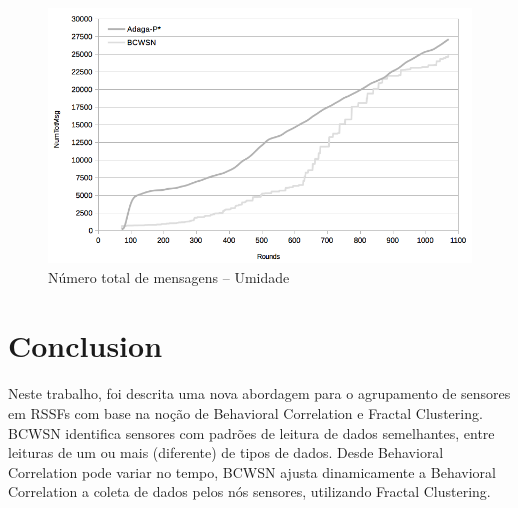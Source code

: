 \documentclass{acm_proc_article-sp}
\begin{document}
\begin{figure}[!htb]
\begin{center}
	\includegraphics[scale=0.3]{BCWSN-TotNumMsgxRound-PB-Hum.png}
	 \vspace*{-.6cm}
    \caption{Número total de mensagens – Umidade}
    \label{fig:tot-num-msg-hum}
\end{center}
\end{figure}

\section{Conclusion}
\label{conclusion}

Neste trabalho, foi descrita uma nova abordagem para o agrupamento
de sensores em RSSFs com base na noção de Behavioral Correlation e Fractal
Clustering. BCWSN identifica sensores com padrões de leitura 
de dados semelhantes, entre leituras de um ou mais (diferente) de tipos 
de dados. Desde Behavioral Correlation pode variar no tempo, BCWSN ajusta
dinamicamente a Behavioral Correlation a coleta de dados pelos nós sensores,
utilizando Fractal Clustering.
\vspace*{-.3cm}
\end{document}
